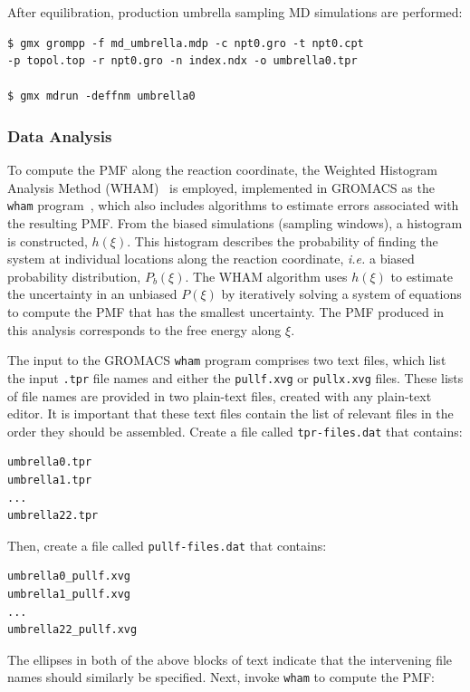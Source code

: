 \documentclass[9pt,tutorial]{livecoms}
\begin{document}
After equilibration, production umbrella sampling MD simulations are performed:

\begin{verbatim}
$ gmx grompp -f md_umbrella.mdp -c npt0.gro -t npt0.cpt 
-p topol.top -r npt0.gro -n index.ndx -o umbrella0.tpr

$ gmx mdrun -deffnm umbrella0
\end{verbatim}

\subsubsection{Data Analysis} \label{umbrella_analysis}

To compute the PMF along the reaction coordinate, the Weighted Histogram Analysis Method (WHAM)~\cite{Kumar1992} is employed, implemented in GROMACS as the \texttt{wham} program~\cite{Hub2010}, which also includes algorithms to estimate errors associated with the resulting PMF. From the biased simulations (sampling windows), a histogram is constructed, $h(\xi)$. This histogram describes the probability of finding the system at individual locations along the reaction coordinate, {\em i.e.} a biased probability distribution, $P_b(\xi)$. The WHAM algorithm uses $h(\xi)$ to estimate the uncertainty in an unbiased $P(\xi)$ by iteratively solving a system of equations to compute the PMF that has the smallest uncertainty. The PMF produced in this analysis corresponds to the free energy along $\xi$.

The input to the GROMACS \texttt{wham} program comprises two text files, which list the input \texttt{.tpr} file names and either the \texttt{pullf.xvg} or \texttt{pullx.xvg} files. These lists of file names are provided in two plain-text files, created with any plain-text editor. It is important that these text files contain the list of relevant files in the order they should be assembled. Create a file called \texttt{tpr-files.dat} that contains:

\begin{verbatim}
umbrella0.tpr
umbrella1.tpr
...
umbrella22.tpr
\end{verbatim}

Then, create a file called \texttt{pullf-files.dat} that contains:

\begin{verbatim}
umbrella0_pullf.xvg
umbrella1_pullf.xvg
...
umbrella22_pullf.xvg
\end{verbatim}

The ellipses in both of the above blocks of text indicate that the intervening file names should similarly be specified. Next, invoke \texttt{wham} to compute the PMF:
\end{document}
